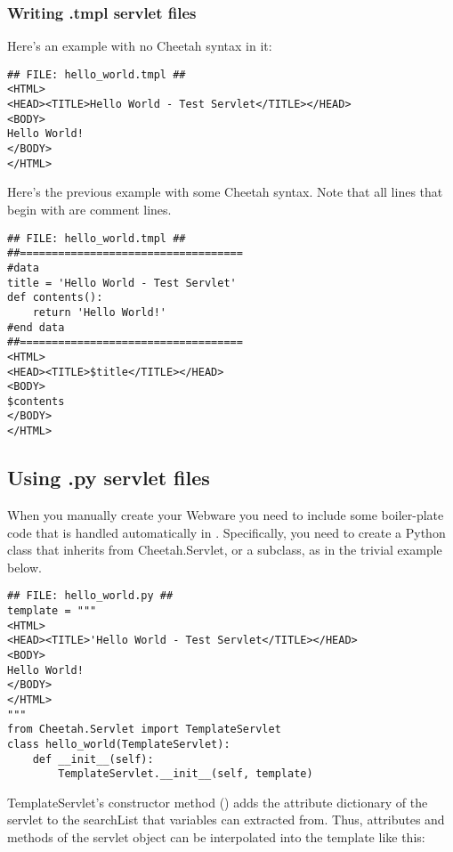\subsubsection{Writing .tmpl servlet files}
\label{webware.tmpl.writing}

Here's an example  with no Cheetah syntax in it:

\begin{verbatim}
## FILE: hello_world.tmpl ##
<HTML>
<HEAD><TITLE>Hello World - Test Servlet</TITLE></HEAD>
<BODY>
Hello World!
</BODY>
</HTML>
\end{verbatim}

Here's the previous example with some Cheetah syntax.  Note that all lines that begin with
\code{\#\#} are comment lines.

\begin{verbatim}
## FILE: hello_world.tmpl ##
##===================================
#data
title = 'Hello World - Test Servlet'
def contents():
    return 'Hello World!'
#end data
##===================================
<HTML>
<HEAD><TITLE>$title</TITLE></HEAD>
<BODY>
$contents
</BODY>
</HTML>
\end{verbatim}


\subsection{Using .py servlet files}
\label{webware.py}

When you manually create your Webware  you need to
include some boiler-plate code that is handled automatically in . Specifically, you need to create a Python class that inherits
from Cheetah.Servlet, or a subclass, as in the trivial example below.

\begin{verbatim}
## FILE: hello_world.py ##
template = """
<HTML>
<HEAD><TITLE>'Hello World - Test Servlet</TITLE></HEAD>
<BODY>
Hello World!
</BODY>
</HTML>
"""
from Cheetah.Servlet import TemplateServlet
class hello_world(TemplateServlet):
    def __init__(self):
        TemplateServlet.__init__(self, template) 
\end{verbatim}

TemplateServlet's constructor method () adds
the attribute dictionary of the servlet to the searchList that
 variables can extracted from.  Thus, attributes and methods
of the servlet object can be interpolated into the template like this:

